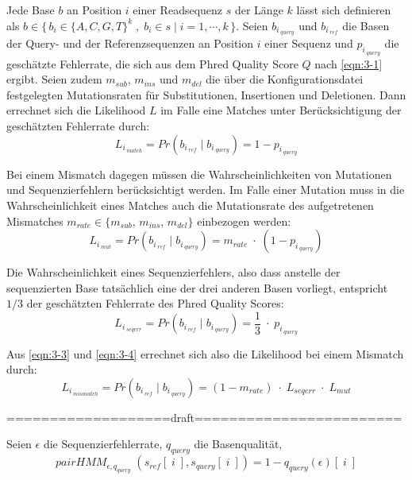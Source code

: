 Jede Base $ b $ an Position $ i $ einer Readsequenz $ s $ der Länge $ k $ lässt sich definieren als $ b \in \{\,b_{i}\in \{A,C,G,T\}^k\;,\; b_{i} \in s \;|\; i = 1, \dotsb, k \,\}$. Seien $ b_{i\,_{query}} $ und $ b_{i\,_{ref}} $ die Basen der Query- und der Referenzsequenzen an Position $ i $ einer Sequenz und $  p_{i\,_{query}} $ die geschätzte Fehlerrate, die sich aus dem Phred Quality Score $ Q $ nach  \eqref{eqn:3-1} ergibt. Seien zudem $ m_{sub} $, $ m_{ins} $ und $ m_{del} $ die über die Konfigurationsdatei festgelegten Mutationsraten für Substitutionen, Insertionen und Deletionen. Dann errechnet sich die Likelihood $ L $ im Falle eine Matches unter Berücksichtigung der geschätzten Fehlerrate durch:
\begin{equation} \label{eqn:3-2}
\tag{3-2}
L_{i\,_{match}} =Pr(b_{i\,_{ref}}\;|\; b_{i\,_{query}}) = 1 - p_{i\,_{query}}
\end{equation}

Bei einem Mismatch dagegen müssen die Wahrscheinlichkeiten von Mutationen und Sequenzierfehlern berücksichtigt werden. Im Falle einer Mutation muss in die Wahrscheinlichkeit eines Matches auch die Mutationsrate des aufgetretenen Mismatches $ m_{rate} \in \{m_{sub} $, $ m_{ins} $, $ m_{del}\} $ einbezogen werden:
\begin{equation} \label{eqn:3-3}
\tag{3-3}
L_{i\,_{mut}} = Pr(b_{i\,_{ref}}\;|\; b_{i\,_{query}}) = m_{rate}\; \cdotp \;(1 - p_{i\,_{query}})
\end{equation}

Die Wahrscheinlichkeit eines Sequenzierfehlers, also dass anstelle der sequenzierten Base tatsächlich eine der drei anderen Basen vorliegt, entspricht $ 1/3 $ der geschätzten Fehlerrate des Phred Quality Scores:
\begin{equation} \label{eqn:3-4}
\tag{3-4}
L_{i\,_{seqerr}} = Pr(b_{i\,_{ref}}\;|\; b_{i\,_{query}}) = \frac{1}{3} \; \cdotp \; p_{i\,_{query}}
\end{equation}

Aus \eqref{eqn:3-3} und \eqref{eqn:3-4} errechnet sich also die Likelihood bei einem Mismatch durch:
\begin{equation} \label{eqn:3-5}
\tag{3-5}
L_{i\,_{mismatch}} = Pr(b_{i\,_{ref}}\;|\; b_{i\,_{query}}) = (1-m_{rate}) \; \cdotp \; L_{seqerr} \; \cdotp \; L_{mut}
\end{equation}

===================draft========================

Seien $ \epsilon $ die Sequenzierfehlerrate, $ q_{query} $ die Basenqualität,
\begin{equation} \label{eqn:3-6}
\tag{3-6}
pairHMM_{\epsilon, q_{query}} \;(s_{ref}[\;i\;], s_{query}[\;i\;]) = 1 - q_{query}(\epsilon)[\;i\;]
\end{equation}


